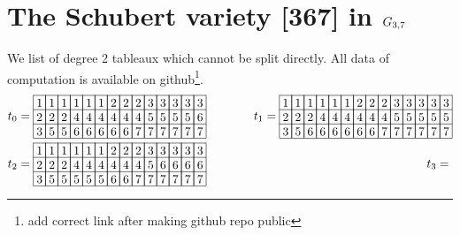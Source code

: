 \section{The Schubert variety [367] in $G_{{3},{7}}$}
\label{sec:sch367}

We list of degree 2 tableaux which cannot be split directly. All data of computation is available on github\footnote{add correct link after making github repo public}.
\begin{align*}
    &t_0 = 
\begin{array}[c]{*{14}c}\cline{1-14}
\lr{1}&\lr{1}&\lr{1}&\lr{1}&\lr{1}&\lr{1}&\lr{2}&\lr{2}&\lr{2}&\lr{3}&\lr{3}&\lr{3}&\lr{3}&\lr{3}\\\cline{1-14}
\lr{2}&\lr{2}&\lr{2}&\lr{4}&\lr{4}&\lr{4}&\lr{4}&\lr{4}&\lr{4}&\lr{5}&\lr{5}&\lr{5}&\lr{5}&\lr{6}\\\cline{1-14}
\lr{3}&\lr{5}&\lr{5}&\lr{6}&\lr{6}&\lr{6}&\lr{6}&\lr{6}&\lr{7}&\lr{7}&\lr{7}&\lr{7}&\lr{7}&\lr{7}\\\cline{1-14}
\end{array}\hspace{30pt}
    &t_1 = 
\begin{array}[c]{*{14}c}\cline{1-14}
\lr{1}&\lr{1}&\lr{1}&\lr{1}&\lr{1}&\lr{1}&\lr{2}&\lr{2}&\lr{2}&\lr{3}&\lr{3}&\lr{3}&\lr{3}&\lr{3}\\\cline{1-14}
\lr{2}&\lr{2}&\lr{2}&\lr{4}&\lr{4}&\lr{4}&\lr{4}&\lr{4}&\lr{4}&\lr{5}&\lr{5}&\lr{5}&\lr{5}&\lr{5}\\\cline{1-14}
\lr{3}&\lr{5}&\lr{6}&\lr{6}&\lr{6}&\lr{6}&\lr{6}&\lr{6}&\lr{7}&\lr{7}&\lr{7}&\lr{7}&\lr{7}&\lr{7}\\\cline{1-14}
\end{array}\\
    &t_2 = \begin{array}[c]{*{14}c}\cline{1-14}
\lr{1}&\lr{1}&\lr{1}&\lr{1}&\lr{1}&\lr{1}&\lr{2}&\lr{2}&\lr{2}&\lr{3}&\lr{3}&\lr{3}&\lr{3}&\lr{3}\\\cline{1-14}
\lr{2}&\lr{2}&\lr{2}&\lr{4}&\lr{4}&\lr{4}&\lr{4}&\lr{4}&\lr{4}&\lr{5}&\lr{6}&\lr{6}&\lr{6}&\lr{6}\\\cline{1-14}
\lr{3}&\lr{5}&\lr{5}&\lr{5}&\lr{5}&\lr{5}&\lr{6}&\lr{6}&\lr{7}&\lr{7}&\lr{7}&\lr{7}&\lr{7}&\lr{7}\\\cline{1-14}
\end{array}\hspace{30pt}
    &t_3 = \begin{array}[c]{*{14}c}\cline{1-14}

\end{array}
\end{align*}

